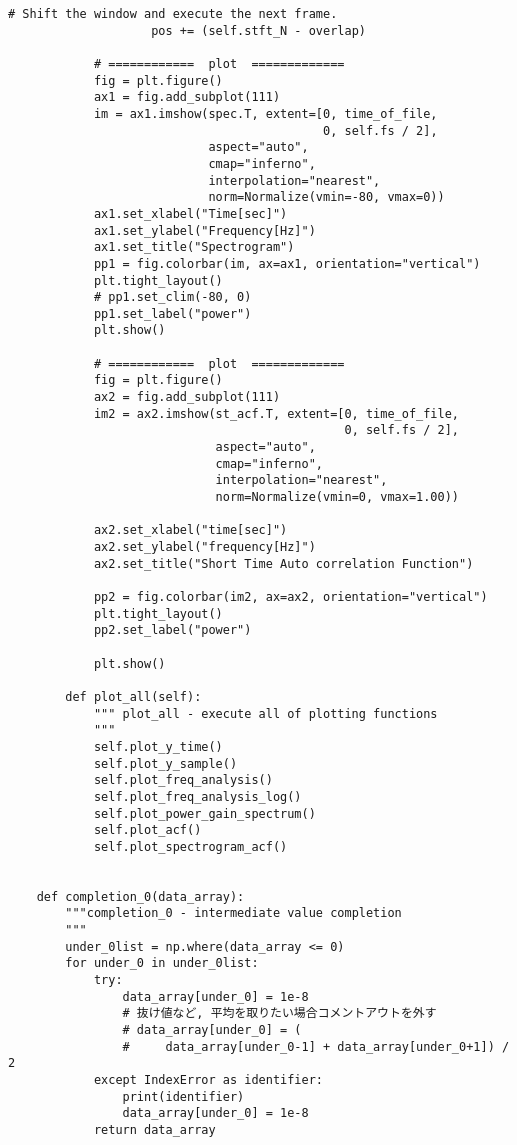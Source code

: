 \begin{lstlisting}[caption=plot\_tools.py,label=plot_tools.py]
                    # Shift the window and execute the next frame.
                    pos += (self.stft_N - overlap)
    
            # ============  plot  =============
            fig = plt.figure()
            ax1 = fig.add_subplot(111)
            im = ax1.imshow(spec.T, extent=[0, time_of_file,
                                            0, self.fs / 2],
                            aspect="auto",
                            cmap="inferno",
                            interpolation="nearest",
                            norm=Normalize(vmin=-80, vmax=0))
            ax1.set_xlabel("Time[sec]")
            ax1.set_ylabel("Frequency[Hz]")
            ax1.set_title("Spectrogram")
            pp1 = fig.colorbar(im, ax=ax1, orientation="vertical")
            plt.tight_layout()
            # pp1.set_clim(-80, 0)
            pp1.set_label("power")
            plt.show()
    
            # ============  plot  =============
            fig = plt.figure()
            ax2 = fig.add_subplot(111)
            im2 = ax2.imshow(st_acf.T, extent=[0, time_of_file,
                                               0, self.fs / 2],
                             aspect="auto",
                             cmap="inferno",
                             interpolation="nearest",
                             norm=Normalize(vmin=0, vmax=1.00))
    
            ax2.set_xlabel("time[sec]")
            ax2.set_ylabel("frequency[Hz]")
            ax2.set_title("Short Time Auto correlation Function")
    
            pp2 = fig.colorbar(im2, ax=ax2, orientation="vertical")
            plt.tight_layout()
            pp2.set_label("power")
    
            plt.show()
    
        def plot_all(self):
            """ plot_all - execute all of plotting functions
            """
            self.plot_y_time()
            self.plot_y_sample()
            self.plot_freq_analysis()
            self.plot_freq_analysis_log()
            self.plot_power_gain_spectrum()
            self.plot_acf()
            self.plot_spectrogram_acf()
    
    
    def completion_0(data_array):
        """completion_0 - intermediate value completion
        """
        under_0list = np.where(data_array <= 0)
        for under_0 in under_0list:
            try:
                data_array[under_0] = 1e-8
                # 抜け値など, 平均を取りたい場合コメントアウトを外す
                # data_array[under_0] = (
                #     data_array[under_0-1] + data_array[under_0+1]) / 2
            except IndexError as identifier:
                print(identifier)
                data_array[under_0] = 1e-8
            return data_array
    

\end{lstlisting}

